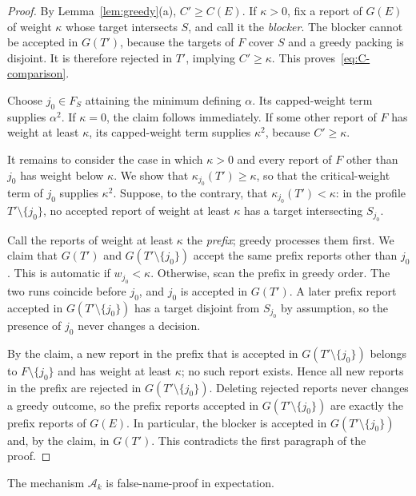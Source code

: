\documentclass[format=acmsmall, review=false]{acmart}
\begin{document}
\begin{proof}
By Lemma~\ref{lem:greedy}(a), \(C'\ge C(E)\). If \(\kappa>0\),
fix a report of \(G(E)\) of weight \(\kappa\) whose target
intersects \(S\), and call it the \emph{blocker}. The blocker
cannot be accepted in \(G(T')\), because the targets of \(F\)
cover \(S\) and a greedy packing is disjoint. It is therefore
rejected in \(T'\), implying \(C'\ge\kappa\). This
proves~\eqref{eq:C-comparison}.

Choose \(j_0\in F_S\) attaining the minimum defining \(\alpha\).
Its capped-weight term supplies \(\alpha^2\). If \(\kappa=0\),
the claim follows immediately. If some other report of \(F\) has
weight at least \(\kappa\), its capped-weight term supplies
\(\kappa^2\), because \(C'\ge\kappa\).

It remains to consider the case in which \(\kappa>0\) and every
report of \(F\) other than \(j_0\) has weight below \(\kappa\).
We show that \(\kappa_{j_0}(T')\ge\kappa\), so that the
critical-weight term of \(j_0\) supplies \(\kappa^2\). Suppose,
to the contrary, that \(\kappa_{j_0}(T')<\kappa\): in the profile
\(T'\setminus\{j_0\}\), no accepted report of weight at least
\(\kappa\) has a target intersecting \(S_{j_0}\).

Call the reports of weight at least \(\kappa\) the \emph{prefix};
greedy processes them first. We claim that \(G(T')\) and
\(G(T'\setminus\{j_0\})\) accept the same prefix reports other
than \(j_0\). This is automatic if \(w_{j_0}<\kappa\). Otherwise,
scan the prefix in greedy order. The two runs coincide before
\(j_0\), and \(j_0\) is accepted in \(G(T')\). A later prefix
report accepted in \(G(T'\setminus\{j_0\})\) has a target
disjoint from \(S_{j_0}\) by assumption, so the presence of
\(j_0\) never changes a decision.

By the claim, a new report in the prefix that is accepted in
\(G(T'\setminus\{j_0\})\) belongs to \(F\setminus\{j_0\}\) and
has weight at least \(\kappa\); no such report exists. Hence all
new reports in the prefix are rejected in
\(G(T'\setminus\{j_0\})\). Deleting rejected reports never
changes a greedy outcome, so the prefix reports accepted in
\(G(T'\setminus\{j_0\})\) are exactly the prefix reports of
\(G(E)\). In particular, the blocker is accepted in
\(G(T'\setminus\{j_0\})\) and, by the claim, in \(G(T')\). This
contradicts the first paragraph of the proof.
\end{proof}

\begin{proposition}
\label{prop:fnp-scale}
The mechanism \(\mathcal A_k\) is false-name-proof in
expectation.
\end{proposition}
\end{document}
